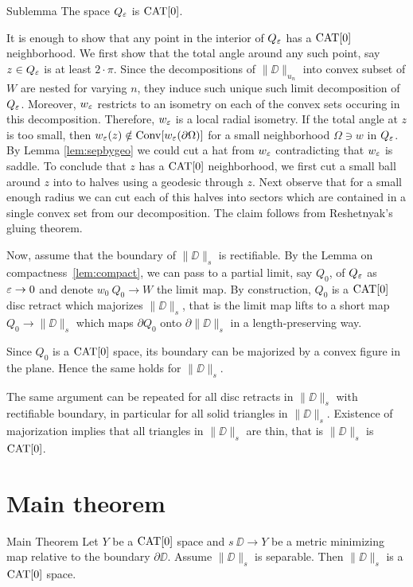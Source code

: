 \documentclass[a4paper,10pt]{amsart}
\begin{document}
\begin{thm}{Sublemma}
The space $Q_\varepsilon$ is $\mathop{\rm CAT}\nolimits[0]$. 
\end{thm}

It is enough to show that any point in the interior of $Q_\varepsilon$ has a $\mathop{\rm CAT}\nolimits[0]$ neighborhood.
We first show that the total angle around any such point, say $z\in Q_\varepsilon$ is at least $2\cdot\pi$.
Since the decompositions of $\|\DD\|_{u_n}$ into convex subset of $W$ are nested for varying $n$, they
induce such unique such limit decomposition of $Q_\varepsilon$. Moreover, $w_\varepsilon$ restricts to an isometry on each 
of the convex sets occuring in this decomposition. Therefore, $w_\varepsilon$ is a local radial isometry.
If the total angle at $z$ is too small, then $w_\varepsilon(z)\notin\mathop{\rm Conv}\nolimits [w_\varepsilon (\partial\Omega)]$
for a small neighborhood $\Omega\ni w$ in $Q_\varepsilon$. By Lemma \ref{lem:sepbygeo} we could cut a hat from $w_\varepsilon$
contradicting that $w_\varepsilon$ is saddle.
To conclude that $z$ has a $\mathop{\rm CAT}\nolimits[0]$ neighborhood, we first cut a small ball around $z$ into to halves using a geodesic through $z$.
Next observe that for a small enough radius we can cut each of this halves into sectors which are contained in a single convex set
from our decomposition. The claim follows from Reshetnyak's gluing theorem.
\qeds


Now, assume that the boundary of $\|\DD\|_s$ is rectifiable.
By the Lemma on compactness~\ref{lem:compact},
we can pass to a partial limit, say $Q_0$, of $Q_\varepsilon$ as $\varepsilon\to 0$ and denote $w_0\:Q_0\to W$ the limit map.
By construction, $Q_0$ is a $\mathop{\rm CAT}\nolimits[0]$ disc retract which majorizes $\|\DD\|_s$,
that is the limit map lifts to a short map $Q_0\to \|\DD\|_s$ which maps $\partial Q_0$ onto  $\partial \|\DD\|_s$ in a length-preserving way.

Since $Q_0$ is a $\mathop{\rm CAT}\nolimits[0]$ space, its boundary can be majorized by a convex figure in the plane.
Hence the same holds for $\|\DD\|_s$.

The same argument can be repeated for all disc retracts in $\|\DD\|_s$ with rectifiable boundary, in particular for all solid triangles in $\|\DD\|_s$.
Existence of majorization implies that all triangles in $\|\DD\|_s$ are thin, that is $\|\DD\|_s$ is $\mathop{\rm CAT}\nolimits[0]$.
\qeds

\section{Main theorem}

\begin{thm}{Main Theorem}\label{thm:main}
Let $Y$ be a $\mathop{\rm CAT}\nolimits[0]$ space 
and $s\:\DD\to Y$ be a metric minimizing map relative to the boundary $\partial\DD$.
Assume $\|\DD\|_s$  is separable. 
Then $\|\DD\|_s$ is a $\mathop{\rm CAT}\nolimits[0]$ space.
\end{thm}
\end{document}

